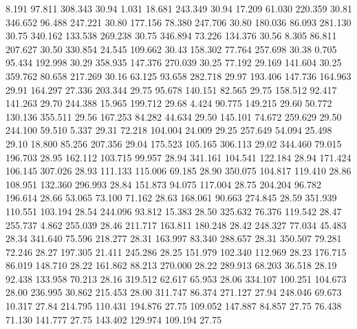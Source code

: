    8.191   97.811  308.343        30.94
   1.031   18.681  243.349        30.94
  17.209   61.030  220.359        30.81
 346.652   96.488  247.221        30.80
 177.156   78.380  247.706        30.80
 180.036   86.093  281.130        30.75
 340.162  133.538  269.238        30.75
 346.894   73.226  134.376        30.56
   8.305   86.811  207.627        30.50
 330.854   24.545  109.662        30.43
 158.302   77.764  257.698        30.38
   0.705   95.434  192.998        30.29
 358.935  147.376  270.039        30.25
  77.192   29.169  141.604        30.25
 359.762   80.658  217.269        30.16
  63.125   93.658  282.718        29.97
 193.406  147.736  164.963        29.91
 164.297   27.336  203.344        29.75
  95.678  140.151   82.565        29.75
 158.512   92.417  141.263        29.70
 244.388   15.965  199.712        29.68
   4.424   90.775  149.215        29.60
  50.772  130.136  355.511        29.56
 167.253   84.282   44.634        29.50
 145.101   74.672  259.629        29.50
 244.100   59.510    5.337        29.31
  72.218  104.004   24.009        29.25
 257.649   54.094   25.498        29.10
  18.800   85.256  207.356        29.04
 175.523  105.165  306.113        29.02
 344.460   79.015  196.703        28.95
 162.112  103.715   99.957        28.94
 341.161  104.541  122.184        28.94
 171.424  106.145  307.026        28.93
 111.133  115.006   69.185        28.90
 350.075  104.817  119.410        28.86
 108.951  132.360  296.993        28.84
 151.873   94.075  117.004        28.75
 204.204   96.782  196.614        28.66
  53.065   73.100   71.162        28.63
 168.061   90.663  274.845        28.59
 351.939  110.551  103.194        28.54
 244.096   93.812   15.383        28.50
 325.632   76.376  119.542        28.47
 255.737    4.862  255.039        28.46
 211.717  163.811  180.248        28.42
 248.327   77.034   45.483        28.34
 341.640   75.596  218.277        28.31
 163.997   83.340  288.657        28.31
 350.507   79.281   72.246        28.27
 197.305   21.411  245.286        28.25
 151.979  102.340  112.969        28.23
 176.715   86.019  148.710        28.22
 161.862   88.213  270.000        28.22
 289.913   68.203   36.518        28.19
  92.438  133.958   70.213        28.16
 319.512   62.617   65.953        28.06
 334.107  100.251  104.673        28.00
 236.995   30.862  215.453        28.00
 311.747   86.374  271.127        27.94
 248.046   69.673   10.317        27.84
 214.795  110.431  194.876        27.75
 109.052  147.887   84.857        27.75
  76.438   71.130  141.777        27.75
 143.402  129.974  109.194        27.75
